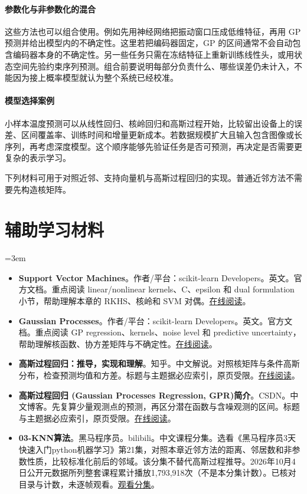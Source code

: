 \paragraph{参数化与非参数化的混合}
这些方法也可以组合使用。例如先用神经网络把振动窗口压成低维特征，再用 GP 预测并给出模型内的不确定性。这里若把编码器固定，GP 的区间通常不会自动包含编码器本身的不确定性。另一些任务只需在冻结特征上重新训练线性头，或用状态空间先验约束序列预测。组合前要说明每部分负责什么、哪些误差仍未计入，不能因为接上概率模型就认为整个系统已经校准。

\paragraph{模型选择案例}
小样本温度预测可以从线性回归、核岭回归和高斯过程开始，比较留出设备上的误差、区间覆盖率、训练时间和增量更新成本。若数据规模扩大且输入包含图像或长序列，再考虑深度模型。这个顺序能够先验证任务是否可预测，再决定是否需要更复杂的表示学习。

下列材料可用于对照近邻、支持向量机与高斯过程回归的实现。普通近邻方法不需要先构造核矩阵。
\section*{辅助学习材料}
\begingroup
\emergencystretch=3em
\begin{itemize}
\item \textbf{Support Vector Machines}。作者/平台：scikit-learn Developers。英文。官方文档。重点阅读 linear/nonlinear kernels、C、epsilon 和 dual formulation 小节，帮助理解本章的 RKHS、核岭和 SVM 对偶。\href{https://scikit-learn.org/stable/modules/svm.html}{在线阅读}。
\item \textbf{Gaussian Processes}。作者/平台：scikit-learn Developers。英文。官方文档。重点阅读 GP regression、kernels、noise level 和 predictive uncertainty，帮助理解核函数、协方差矩阵与不确定性。\href{https://scikit-learn.org/stable/modules/gaussian\_process.html}{在线阅读}。
\item \textbf{高斯过程回归：推导，实现和理解}。知乎。中文解说。对照核矩阵与条件高斯分布，检查预测均值和方差。标题与主题据必应索引，原页受限。\href{https://zhuanlan.zhihu.com/p/104601803}{在线阅读}。
\item \textbf{高斯过程回归 (Gaussian Processes Regression, GPR)简介}。CSDN。中文博客。先复算少量观测点的预测，再区分潜在函数与含噪观测的区间。标题与主题据必应索引，原页受限。\href{https://blog.csdn.net/HelloWorldTM/article/details/126980872}{在线阅读}。
\item \textbf{03-KNN算法}。黑马程序员。bilibili。中文课程分集。选看《黑马程序员3天快速入门python机器学习》第21集，对照本章近邻方法的距离、邻居数和非参数性质，比较标准化前后的邻域。该分集不替代高斯过程推导。2026年10月4日公开元数据所列整套课程累计播放1,793,918次（不是本分集计数）。已核对目录与计数，未逐帧观看。\href{https://www.bilibili.com/video/BV1nt411r7tj/?p=21}{观看分集}。
\end{itemize}
\endgroup

